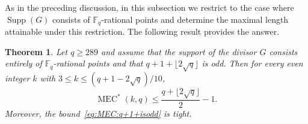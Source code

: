 \documentclass[journal,12pt,onecolumn]{IEEEtran}
\newtheorem{theorem}{Theorem}
\begin{document}
As in the preceding discussion, in this subsection we restrict to the case where $\operatorname{Supp}(G)$ consists of $\mathbb{F}_q$-rational points and determine the maximal length attainable under this restriction. The following result provides the answer.
\begin{theorem}\label{thm:G'and_oddq+1+}
Let $q \ge 289$ and assume that the support of the divisor $G$ consists entirely of $\mathbb{F}_q$-rational points and that $q+1+ \lfloor 2\sqrt{q} \rfloor$ is odd. Then for every even integer $k$ with $3 \le k \le (q + 1 - 2\sqrt{q})/10$,
\begin{equation}\label{eq:MEC:q+1+isodd}
    \operatorname{MEC}^*(k,q) \le \frac{q+ \lfloor 2\sqrt{q} \rfloor}{2} - 1 .
\end{equation}
Moreover, the bound~\eqref{eq:MEC:q+1+isodd} is tight.
\end{theorem}
\end{document}
